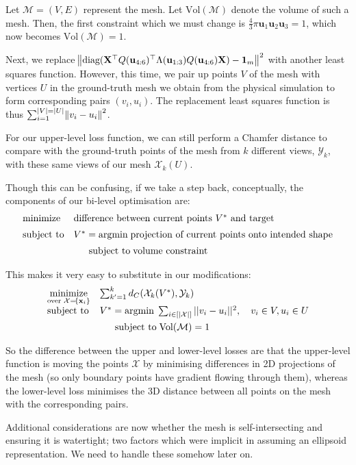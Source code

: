\documentclass{article}
\begin{document}
Let $\mathcal M = (V,E)$ represent the mesh. Let $\text{Vol}(\mathcal M)$ denote the volume of such a mesh. Then, the first constraint which we must change is $\frac{4}{3} \pi \mathbf u_1 \mathbf u_2 \mathbf u_3 = 1$, which now becomes $\text{Vol}(\mathcal M) = 1$.

Next, we replace $\!\left\Vert \text{diag}(\mathbf X^\top Q(\mathbf u_{4:6}) ^\top \Lambda(\mathbf u_{1:3}) Q(\mathbf u_{4:6}) \mathbf X) - \mathbf 1_m \right\Vert ^2$ with another least squares function. However, this time, we pair up points $V$ of the mesh with vertices $U$ in the ground-truth mesh we obtain from the physical simulation to form corresponding pairs $(v_i, u_i)$. The replacement least squares function is thus $\sum_{i=1}^{|V| = |U|}\!\left\Vert v_i - u_i \right\Vert^2$. 

For our upper-level loss function, we can still perform a Chamfer distance to compare with the ground-truth points of the mesh from $k$ different views, $\mathcal Y_k$, with these same views of our mesh $\mathcal X_k(U)$.

Though this can be confusing, if we take a step back, conceptually, the components of our bi-level optimisation are:
$$
\begin{array}{ll}
    \underset{}{\text{minimize}} &  \text{difference between current points $V^*$ and target} \\[0.5em]
  \text{subject to} & V^* = \text{argmin} \; \text{projection of current points onto intended shape} \\[0.5em]
  & \hphantom{y =} \text{subject to} \;  \text{volume constraint}
\end{array}
$$

This makes it very easy to substitute in our modifications:
$$
\begin{array}{ll}
    \underset{\text{over } \mathcal X = \!\left\{ \mathbf x_i \right\} }{\text{minimize}} &  \sum_{k'=1}^k d_C(\mathcal X_k(V^*), \mathcal Y_k) \\[0.5em]
  \text{subject to} & V^* = \text{argmin} \; \sum_{i \in [|\mathcal X|]} ||v_i - u_i||^2, \quad v_i \in V, u_i \in U \\[0.5em]
  & \hphantom{y =} \text{subject to} \;  \text{Vol}(\mathcal M) = 1
\end{array}
$$

So the difference between the upper and lower-level losses are that the upper-level function is moving the points $\mathcal X$ by minimising differences in 2D projections of the mesh (so only boundary points have gradient flowing through them), whereas the lower-level loss minimises the 3D distance between all points on the mesh with the corresponding pairs.

Additional considerations are now whether the mesh is self-intersecting and ensuring it is watertight; two factors which were implicit in assuming an ellipsoid representation. We need to handle these somehow later on.
\end{document}
